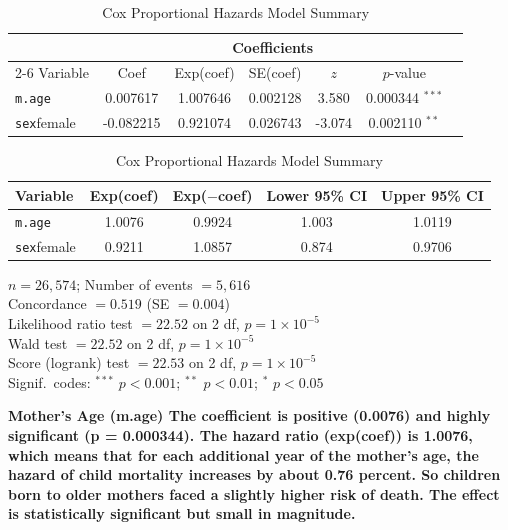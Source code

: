 \documentclass[12pt,letterpaper]{article}
\begin{document}
	\begin{table}[htbp]
		\centering
		\caption{Cox Proportional Hazards Model Summary}
		\label{tab:cox_model}
		\begin{tabular}{lcccccc}
			\hline\hline
			& \multicolumn{5}{c}{Coefficients} \\
			\cline{2-6}
			Variable & Coef & Exp(coef) & SE(coef) & $z$ & $p$-value \\
			\hline
			\texttt{m.age}      & 0.007617 & 1.007646 & 0.002128 &  3.580 & 0.000344 $^{***}$ \\
			\texttt{sex}female  & -0.082215 & 0.921074 & 0.026743 & -3.074 & 0.002110 $^{**}$  \\
			\hline
		\end{tabular}
		
		\vspace{0.5em}
		
		\begin{tabular}{lcccc}
			\hline
			Variable & Exp(coef) & Exp($-$coef) & Lower 95\% CI & Upper 95\% CI \\
			\hline
			\texttt{m.age}     & 1.0076 & 0.9924 & 1.003 & 1.0119 \\
			\texttt{sex}female & 0.9211 & 1.0857 & 0.874 & 0.9706 \\
			\hline\hline
		\end{tabular}
		
		\vspace{0.5em}
		
		\begin{flushleft}
			\small
			$n = 26{,}574$; Number of events $= 5{,}616$ \\
			Concordance $= 0.519$ (SE $= 0.004$) \\
			Likelihood ratio test $= 22.52$ on 2 df, $p = 1 \times 10^{-5}$ \\
			Wald test $= 22.52$ on 2 df, $p = 1 \times 10^{-5}$ \\
			Score (logrank) test $= 22.53$ on 2 df, $p = 1 \times 10^{-5}$ \\[4pt]
			Signif.\ codes: $^{***}$ $p < 0.001$; $^{**}$ $p < 0.01$; $^{*}$ $p < 0.05$
		\end{flushleft}
	\end{table}
	
	\textbf{Mother's Age (m.age)
		The coefficient is positive (0.0076) and highly significant (p = 0.000344). The hazard ratio (exp(coef)) is 1.0076, which means that for each additional year of the mother's age, the hazard of child mortality increases by about 0.76 percent. So children born to older mothers faced a slightly higher risk of death. The effect is statistically significant but small in magnitude.}
		
\end{document}
